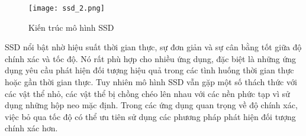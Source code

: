 \documentclass[../the.tex]{subfiles}
\begin{document}
\begin{figure}[H]
	\centering
	\texttt{[image: ssd\_2.png]}
	\caption{Kiến trúc mô hình SSD \cite{Liu_2016}}
	\label{fig:ssd2}
\end{figure}
\bigskip

{\fontsize{13}{12} \selectfont 
SSD nổi bật nhờ hiệu suất thời gian thực, sự đơn giản và sự cân bằng tốt giữa độ chính xác và tốc độ. Nó rất phù hợp cho nhiều ứng dụng, đặc biệt là những ứng dụng yêu cầu phát hiện đối tượng hiệu quả trong các tình huống thời gian thực hoặc gần thời gian thực.
Tuy nhiên mô hình SSD vẫn gặp một số thách thức với các vật thể nhỏ, các vật thể bị chồng chéo lên nhau với các nền phức tạp vì sử dụng những hộp neo mặc định. 
Trong các ứng dụng quan trọng về độ chính xác, việc bỏ qua tốc độ có thể ưu tiên sử dụng các phương pháp phát hiện đối tượng chính xác hơn.

}
\end{document}
